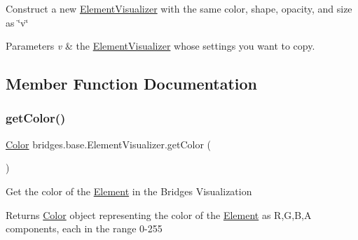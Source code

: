 Construct a new \mbox{\hyperlink{classbridges_1_1base_1_1_element_visualizer}{Element\+Visualizer}} with the same color, shape, opacity, and size as \char`\"{}v\char`\"{}


\begin{DoxyParams}{Parameters}
{\em v} & the \mbox{\hyperlink{classbridges_1_1base_1_1_element_visualizer}{Element\+Visualizer}} whose settings you want to copy. \\
\hline
\end{DoxyParams}


\subsection{Member Function Documentation}
\mbox{\label{classbridges_1_1base_1_1_element_visualizer_a3bf821b9bfa02746882bac934ce4fb8e}} 
\subsubsection{\texorpdfstring{get\+Color()}{getColor()}}
{\footnotesize\ttfamily \mbox{\hyperlink{classbridges_1_1base_1_1_color}{Color}} bridges.\+base.\+Element\+Visualizer.\+get\+Color (\begin{DoxyParamCaption}{ }\end{DoxyParamCaption})}

Get the color of the \mbox{\hyperlink{classbridges_1_1base_1_1_element}{Element}} in the Bridges Visualization

\begin{DoxyReturn}{Returns}
\mbox{\hyperlink{classbridges_1_1base_1_1_color}{Color}} object representing the color of the \mbox{\hyperlink{classbridges_1_1base_1_1_element}{Element}} as R,G,B,A components, each in the range 0-\/255 
\end{DoxyReturn}
\mbox{\label{classbridges_1_1base_1_1_element_visualizer_aec8d0e757d323ff6122a2e05ab89f852}} 
